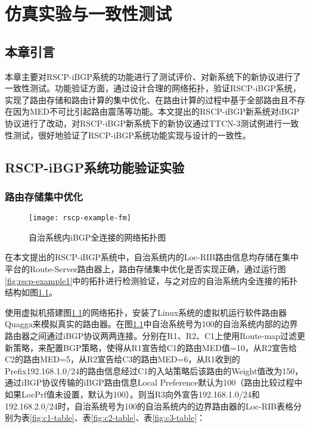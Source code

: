 \chapter{仿真实验与一致性测试}
\label{cha:evaluate}


\section{本章引言}
本章主要对RSCP-iBGP系统的功能进行了测试评价、对新系统下的新协议进行了一致性测试。功能验证方面，通过设计合理的网络拓扑，验证RSCP-iBGP系统，实现了路由存储和路由计算的集中优化、在路由计算的过程中基于全部路由且不存在因为MED不可比引起路由震荡等功能。本文提出的RSCP-iBGP新系统对iBGP协议进行了改动，对RSCP-iBGP新系统下的新协议通过TTCN-3测试例进行一致性测试，很好地验证了RSCP-iBGP系统功能实现与设计的一致性。

\section{RSCP-iBGP系统功能验证实验}

\subsection{路由存储集中优化}


\begin{figure}
  \centering
  \texttt{[image: rscp-example-fm]}
  \caption{自治系统内iBGP全连接的网络拓扑图}
  \label{fig:rscp-example-fm}
\end{figure}

在本文提出的RSCP-iBGP系统中，自治系统内的Loc-RIB路由信息均存储在集中平台的Route-Server路由器上，路由存储集中优化是否实现正确，通过运行图\ref{fig:rscp-example1}中的拓扑进行检测验证，与之对应的自治系统内全连接的拓扑结构如图\ref{fig:rscp-example-fm}。

使用虚拟机搭建图\ref{fig:rscp-example-fm}的网络拓扑，安装了Linux系统的虚拟机运行软件路由器Quagga来模拟真实的路由器。在图\ref{fig:rscp-example-fm}中自治系统号为100的自治系统内部的边界路由器之间通过iBGP协议两两连接。分别在R1、R2、C1上使用Route-map过滤更新策略，来配置BGP策略，使得从R1宣告给C1的路由MED值=10，从R2宣告给C2的路由MED=5，从R2宣告给C3的路由MED=6，从R1收到的Prefix192.168.1.0/24的路由信息经过C1的入站策略后该路由的Weight值改为150，通过iBGP协议传输的iBGP路由信息Local Preference默认为100（路由比较过程中如果LocPrf值未设置，默认为100）。则当R3向外宣告192.168.1.0/24和192.168.2.0/24时，自治系统号为100的自治系统内的边界路由器的Loc-RIB表格分别为表\ref{fig:c1-table}、表\ref{fig:c2-table}、表\ref{fig:c3-table}：

